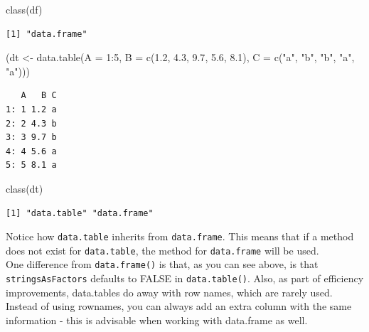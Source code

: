 \documentclass[
]{book}
\newenvironment{Shaded}{\begin{snugshade}}{\end{snugshade}}
\newcommand{\AttributeTok}[1]{\textcolor[rgb]{0.77,0.63,0.00}{#1}}
\newcommand{\DecValTok}[1]{\textcolor[rgb]{0.00,0.00,0.81}{#1}}
\newcommand{\FloatTok}[1]{\textcolor[rgb]{0.00,0.00,0.81}{#1}}
\newcommand{\FunctionTok}[1]{\textcolor[rgb]{0.00,0.00,0.00}{#1}}
\newcommand{\NormalTok}[1]{#1}
\newcommand{\OtherTok}[1]{\textcolor[rgb]{0.56,0.35,0.01}{#1}}
\newcommand{\SpecialCharTok}[1]{\textcolor[rgb]{0.00,0.00,0.00}{#1}}
\newcommand{\StringTok}[1]{\textcolor[rgb]{0.31,0.60,0.02}{#1}}
\begin{document}
\begin{Shaded}
\begin{Highlighting}[]
\FunctionTok{class}\NormalTok{(df)}
\end{Highlighting}
\end{Shaded}

\begin{verbatim}
[1] "data.frame"
\end{verbatim}

\begin{Shaded}
\begin{Highlighting}[]
\NormalTok{(dt }\OtherTok{\textless{}{-}} \FunctionTok{data.table}\NormalTok{(}\AttributeTok{A =} \DecValTok{1}\SpecialCharTok{:}\DecValTok{5}\NormalTok{,}
                  \AttributeTok{B =} \FunctionTok{c}\NormalTok{(}\FloatTok{1.2}\NormalTok{, }\FloatTok{4.3}\NormalTok{, }\FloatTok{9.7}\NormalTok{, }\FloatTok{5.6}\NormalTok{, }\FloatTok{8.1}\NormalTok{),}
                  \AttributeTok{C =} \FunctionTok{c}\NormalTok{(}\StringTok{"a"}\NormalTok{, }\StringTok{"b"}\NormalTok{, }\StringTok{"b"}\NormalTok{, }\StringTok{"a"}\NormalTok{, }\StringTok{"a"}\NormalTok{)))}
\end{Highlighting}
\end{Shaded}

\begin{verbatim}
   A   B C
1: 1 1.2 a
2: 2 4.3 b
3: 3 9.7 b
4: 4 5.6 a
5: 5 8.1 a
\end{verbatim}

\begin{Shaded}
\begin{Highlighting}[]
\FunctionTok{class}\NormalTok{(dt)}
\end{Highlighting}
\end{Shaded}

\begin{verbatim}
[1] "data.table" "data.frame"
\end{verbatim}

Notice how \texttt{data.table} inherits from \texttt{data.frame}. This means that if a method does not exist for \texttt{data.table}, the method for \texttt{data.frame} will be used.\\
One difference from \texttt{data.frame()} is that, as you can see above, is that \texttt{stringsAsFactors} defaults to FALSE in \texttt{data.table()}. Also, as part of efficiency improvements, data.tables do away with row names, which are rarely used. Instead of using rownames, you can always add an extra column with the same information - this is advisable when working with data.frame as well.
\end{document}
